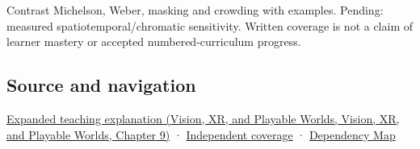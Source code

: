 Contrast Michelson, Weber, masking and crowding with examples. Pending: measured spatiotemporal/chromatic sensitivity. Written coverage is not a claim of learner mastery or accepted numbered-curriculum progress.

\subsection{Source and navigation}\label{appendix-b3aa9e8e01ad-source-and-navigation}

\href{../07-Vision-XR-and-Playable-Worlds/main.pdf\#nameddest=04-visual-computing-ii-ch042-visibility-is-about-contrast-conditions-and-tasks}{Expanded teaching explanation (Vision, XR, and Playable Worlds, Vision, XR, and Playable Worlds, Chapter 9)} · \hyperref[appendix-fd090d982a15-xr01---independent-seeing-and-representation-source]{Independent coverage} · \hyperref[appendix-4ad47bdd269a]{Dependency Map}

